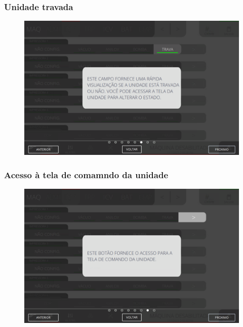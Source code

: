 \newpage
\thispagestyle{fancy}
\vspace*{40 pt}
\subsubsection{\small{Unidade travada}} \label{sec:telaComandoImpressorasUnidadeTravada}
\vspace*{\fill}
\begin{figure}[h]
    \centering
    \includegraphics[width=576 px,height=360 px]{src/imagesICV/04-printters/01-printters/commands/6.png}
\end{figure}
\vspace*{\fill}

\newpage
\thispagestyle{fancy}
\vspace*{40 pt}
\subsubsection{\small{Acesso à tela de comamndo da unidade}}
\vspace*{\fill}
\begin{figure}[h]
    \centering
    \includegraphics[width=576 px,height=360 px]{src/imagesICV/04-printters/01-printters/commands/7.png}
\end{figure}
\vspace*{\fill}


